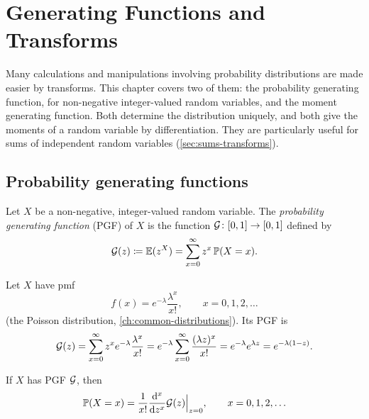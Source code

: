 \chapter{Generating Functions and Transforms}\label{ch:generating-functions}



Many calculations and manipulations involving probability distributions are made easier by transforms. This chapter covers two of them: the probability generating function, for non-negative integer-valued random variables, and the moment generating function. Both determine the distribution uniquely, and both give the moments of a random variable by differentiation. They are particularly useful for sums of independent random variables (\cref{sec:sums-transforms}).

\section{Probability generating functions}\label{sec:pgf}

\begin{definition}\label{def:pgf}
Let $X$ be a non-negative, integer-valued random variable. The \emph{probability generating function} (PGF) of $X$ is the function $\mathcal{G}  \colon [0,1] \to [0,1]$ defined by
\[
  \mathcal{G}(z) \coloneqq \operatorname{\mathbb{E}}(z^X) = \sum_{x=0}^\infty z^x \, \mathbb{P}(X = x).
\]
\end{definition}

\begin{example}\label{ex:pgf-poisson}
Let $X$ have pmf
\[
  f(x) = e^{-\lambda} \frac{\lambda^x}{x!}, \qquad x = 0, 1, 2, \ldots
\]
(the Poisson distribution, \cref{ch:common-distributions}). Its PGF is
\[
  \mathcal{G}(z) = \sum_{x=0}^\infty z^x e^{-\lambda} \frac{\lambda^x}{x!} = e^{-\lambda} \sum_{x=0}^\infty \frac{(\lambda z)^x}{x!} = e^{-\lambda} e^{\lambda z} = e^{-\lambda(1 - z)}.
\]
\end{example}

\begin{theorem}\label{thm:pgf-pmf}
If $X$ has PGF $\mathcal{G}$, then
\[
  \mathbb{P}(X = x) = \frac{1}{x!} \frac{\mathop{}\!\mathrm{d}^x}{\mathop{}\!\mathrm{d} z^x} \mathcal{G}(z) \Big|_{z=0}, \qquad x = 0, 1, 2, \ldots
\]
\end{theorem}

